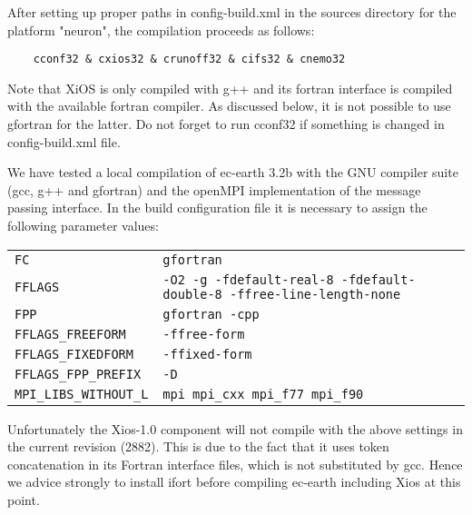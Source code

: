 After setting up proper paths in config-build.xml in the sources directory for the platform "neuron", the compilation proceeds as follows:
\begin{verbatim}
    cconf32 & cxios32 & crunoff32 & cifs32 & cnemo32  
\end{verbatim}
Note that XiOS is only compiled with g++ and its fortran interface is compiled with the available fortran compiler. As discussed below, it is not possible to use gfortran for the latter. Do not forget to run cconf32 if something is changed in config-build.xml file.

We have tested a local compilation of ec-earth 3.2b with the GNU compiler suite (gcc, g++ and gfortran) and the openMPI implementation of the message passing interface. In the build configuration file it is necessary to assign the following parameter values:
\begin{center}
\begin{tabular}{ll}
\texttt{FC}&\texttt{gfortran}\\
\texttt{FFLAGS}&\texttt{-O2 -g -fdefault-real-8 -fdefault-double-8 -ffree-line-length-none}\\
\texttt{FPP}&\texttt{gfortran -cpp}\\
\texttt{FFLAGS\_FREEFORM}&\texttt{-ffree-form}\\
\texttt{FFLAGS\_FIXEDFORM}&\texttt{-ffixed-form}\\
\texttt{FFLAGS\_FPP\_PREFIX}&\texttt{-D}\\
\texttt{MPI\_LIBS\_WITHOUT\_L}&\texttt{mpi mpi\_cxx mpi\_f77 mpi\_f90}\\
\end{tabular}
\end{center}
Unfortunately the Xios-1.0 component will not compile with the above settings in the current revision (2882). This is due to the fact that it uses token concatenation in its Fortran interface files, which is not substituted by gcc. Hence we advice strongly to install ifort before compiling ec-earth including Xios at this point. 

